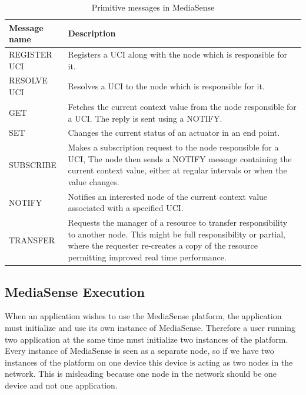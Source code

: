 \begin{center}
\begin{table}
    \begin{tabularx}{\textwidth}{ | l | X |}
    \hline
    Message name 		& 		Description \\ \hline
	REGISTER UCI 		& 		Registers a UCI along with the node which is responsible for it. \\ \hline
	RESOLVE UCI 		& 		Resolves a UCI to the node which is responsible for it. \\ \hline
	GET 				& 		Fetches the current context value from the node responsible for a UCI. The reply is sent using a NOTIFY. \\ \hline
	SET 				& 		Changes the current status of an actuator in an end point. \\ \hline
	SUBSCRIBE 			& 		Makes a subscription request to the node responsible for a UCI, The node then sends a NOTIFY message containing the current context value, either at regular intervals or when the value changes. \\ \hline
	NOTIFY 				& 		Notifies an interested node of the current context value associated with a specified UCI. \\ \hline
	TRANSFER 			& 		Requests the manager of a resource to transfer responsibility to another node. This might be full responsibility or partial, where the requester re-creates a copy of the resource permitting improved real time performance. \\ \hline
    \end{tabularx}
	\caption{Primitive messages in MediaSense}
	\label{tab:table}
\end{table}
\end{center}


\subsection{MediaSense Execution}
When an application wishes to use the MediaSense platform, the application must initialize and use its own instance of MediaSense. Therefore a user running two application at the same time must initialize two instances of the platform. Every instance of MediaSense is seen as a separate node, so if we have two instances of the platform on one device this device is acting as two nodes in the network. This is misleading because one node in the network should be one device and not one application.

